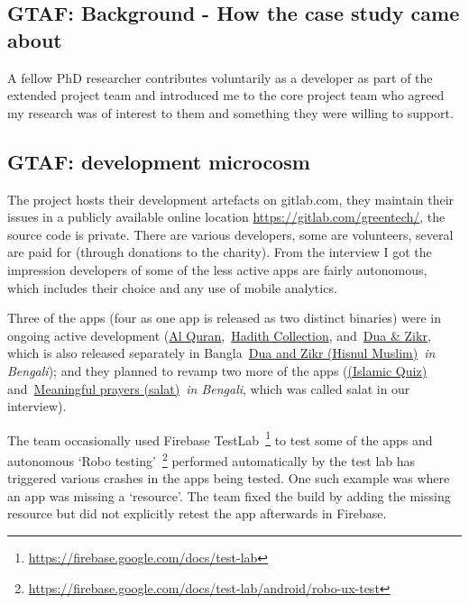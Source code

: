 
\subsection{GTAF: Background - How the case study came about}
A fellow PhD researcher contributes voluntarily as a developer as part of the extended project team and introduced me to the core project team who agreed my research was of interest to them and something they were willing to support.

\subsection{GTAF: development microcosm}
The project hosts their development artefacts on gitlab.com, they maintain their issues in a publicly available online location \url{https://gitlab.com/greentech/}, the source code is private. There are various developers, some are volunteers, several are paid for (through donations to the charity). From the interview I got the impression developers of some of the less active apps are fairly autonomous, which includes their choice and any use of mobile analytics. 

Three of the apps (four as one app is released as two distinct binaries) were in ongoing active development (\href{https://play.google.com/store/apps/details?id=com.greentech.quran}{Al Quran},~\href{https://play.google.com/store/apps/details?id=com.greentech.hadith}{Hadith Collection}, and~\href{https://play.google.com/store/apps/details?id=com.greentech.hisnulmuslim}{Dua \& Zikr}, which is also released separately in Bangla~\href{https://play.google.com/store/apps/details?id=com.greentech.hisnulmuslimbn}{{Dua and Zikr (Hisnul Muslim)}}~\emph{in Bengali}); and they planned to revamp two more of the apps (\href{https://play.google.com/store/apps/details?id=com.greentech.islamicquiz}{(Islamic Quiz)} and~\href{https://play.google.com/store/apps/details?id=com.greentech.salatbn}{Meaningful prayers (salat)}~\textit{in Bengali}, which was called salat in our interview).

The team occasionally used Firebase TestLab~\footnote{\url{https://firebase.google.com/docs/test-lab}} to test some of the apps and autonomous `Robo testing'~\footnote{\url{https://firebase.google.com/docs/test-lab/android/robo-ux-test}} performed automatically by the test lab has triggered various crashes in the apps being tested. One such example was where an app was missing a `resource'. The team fixed the build by adding the missing resource but did not explicitly retest the app afterwards in Firebase.  

